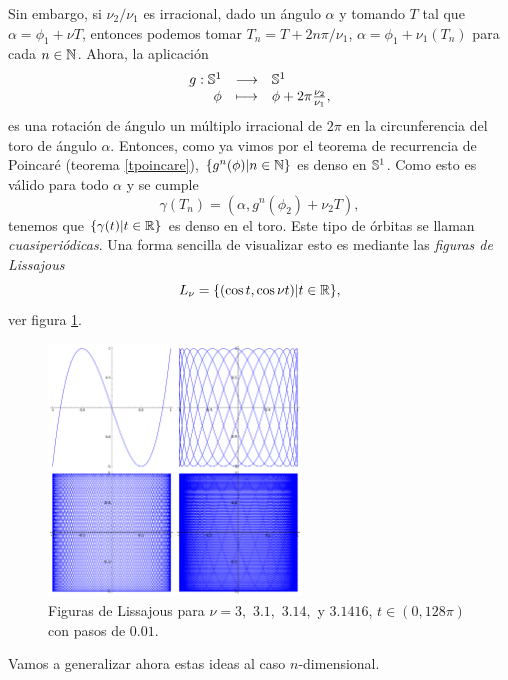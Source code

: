   Sin embargo, si $\nu_2/\nu_1$ es irracional, dado un ángulo $\alpha$ y tomando $T$ tal que $\alpha=\phi_1+\nu T$, entonces podemos tomar $T_n=T+2n\pi/\nu_1$, $\alpha=\phi_1+\nu_1(T_n)$ para cada $n\in \mathbb{N}$. Ahora, la aplicación
  \begin{equation*}
    \begin{array}{rcl}
    g:\mathbb{S}^1 & \longrightarrow &\mathbb{S}^1 \\
  \phi & \longmapsto & \phi + 2\pi\frac{\nu_2}{\nu_1},
  \end{array}
\end{equation*}
es una rotación de ángulo un múltiplo irracional de $2\pi$ en la circunferencia del toro de ángulo $\alpha$. Entonces, como ya vimos por el teorema de recurrencia de Poincaré (teorema \ref{tpoincare}), $\{g^n(\phi)|n\in \mathbb{N}\}$ es denso en $\mathbb{S}^1$. Como esto es válido para todo $\alpha$ y se cumple 
\begin{equation*}
  \gamma(T_n)=(\alpha,g^n(\phi_2)+\nu_2 T),
\end{equation*}
tenemos que $\{\gamma(t)|t \in \mathbb{R} \}$ es denso en el toro. Este tipo de órbitas se llaman \emph{cuasiperiódicas}. Una forma sencilla de visualizar esto es mediante las \emph{figuras de Lissajous} 
\begin{equation*}
  L_{\nu}=\{(\cos t, \cos \nu t) | t \in \mathbb{R}\},
\end{equation*}
ver figura \ref{fig:lissajous}.
\begin{figure}[h!]
  \centering
  \includegraphics[width=0.6\textwidth]{pics/lissajous}
  \caption{\small Figuras de Lissajous para $\nu=3,$ $3.1,$ $3.14,$  y $3.1416$, $t \in (0,128\pi)$ con pasos de $0.01$.}
  \label{fig:lissajous}
\end{figure}

Vamos a generalizar ahora estas ideas al caso $n$-dimensional.

